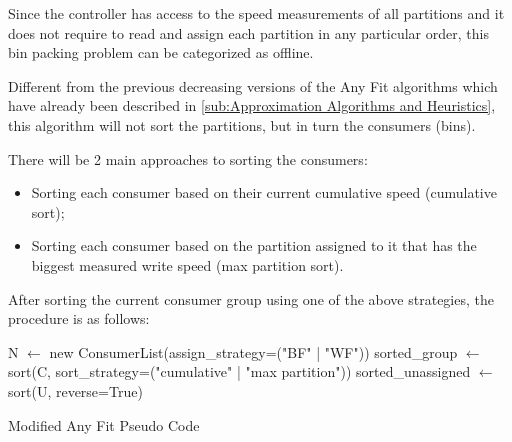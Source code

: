 Since the controller has access to the speed measurements of all partitions and it does not require to read and assign each partition in any particular order, this bin packing problem can be categorized as offline.

Different from the previous decreasing versions of the Any Fit algorithms which have already been described in \ref{sub:Approximation Algorithms and Heuristics}, this algorithm will not sort the partitions, but in turn the consumers (bins).

There will be 2 main approaches to sorting the consumers: 
\begin{itemize}
    \item Sorting each consumer based on their current cumulative speed (cumulative sort);
    \item Sorting each consumer based on the partition assigned to it that has the biggest measured write speed (max partition sort). 
\end{itemize}

After sorting the current consumer group using one of the above strategies, the procedure is as follows:

\IncMargin{1em}
\begin{algorithm}[h]
\BlankLine
N $\leftarrow$ new ConsumerList(assign\_strategy=("BF" | "WF"))\;
sorted\_group $\leftarrow$ sort(C, sort\_strategy=("cumulative" | "max partition"))\;
sorted\_unassigned $\leftarrow$ sort(U, reverse=True)\;
\caption{Modified Any Fit Pseudo Code}\label{algo:MBPP}
\end{algorithm}\DecMargin{1em}


